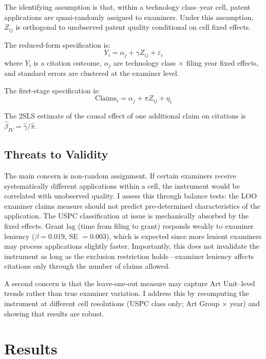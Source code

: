 \documentclass[12pt]{article}
\begin{document}
The identifying assumption is that, within a technology class--year cell, patent applications are quasi-randomly assigned to examiners. Under this assumption, $Z_{ij}$ is orthogonal to unobserved patent quality conditional on cell fixed effects.

The reduced-form specification is:
\begin{equation}
Y_i = \alpha_j + \gamma Z_{ij} + \varepsilon_i
\end{equation}
where $Y_i$ is a citation outcome, $\alpha_j$ are technology class $\times$ filing year fixed effects, and standard errors are clustered at the examiner level.

The first-stage specification is:
\begin{equation}
\text{Claims}_i = \alpha_j + \pi Z_{ij} + \eta_i
\end{equation}

The 2SLS estimate of the causal effect of one additional claim on citations is $\hat{\beta}_{IV} = \hat{\gamma} / \hat{\pi}$.

\subsection{Threats to Validity}

The main concern is non-random assignment. If certain examiners receive systematically different applications within a cell, the instrument would be correlated with unobserved quality. I assess this through balance tests: the LOO examiner claims measure should not predict pre-determined characteristics of the application. The USPC classification at issue is mechanically absorbed by the fixed effects. Grant lag (time from filing to grant) responds weakly to examiner leniency ($\beta = 0.019$, SE $= 0.003$), which is expected since more lenient examiners may process applications slightly faster. Importantly, this does not invalidate the instrument as long as the exclusion restriction holds---examiner leniency affects citations only through the number of claims allowed.

A second concern is that the leave-one-out measure may capture Art Unit--level trends rather than true examiner variation. I address this by recomputing the instrument at different cell resolutions (USPC class only; Art Group $\times$ year) and showing that results are robust.

\section{Results}
\end{document}
